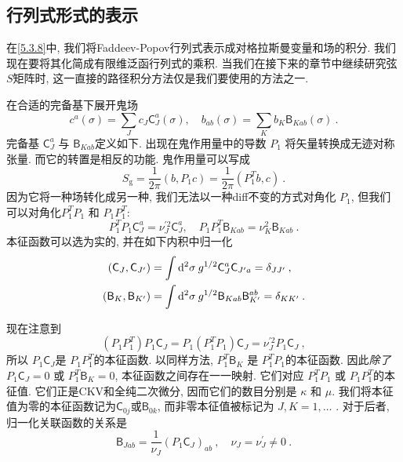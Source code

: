 \subsection*{行列式形式的表示}

在\eqref{5.3.8}中, 我们将Faddeev-Popov行列式表示成对格拉斯曼变量和场的积分. 我们现在要将其化简成有限维泛函行列式的乘积. 
当我们在接下来的章节中继续研究弦$S$矩阵时, 这一直接的路径积分方法仅是我们要使用的方法之一.

在合适的完备基下展开鬼场
\begin{equation}
	c^{a}(\sigma)=\sum_{J} c_{J} \mathsf{C}_{J}^{a}(\sigma), \quad b_{a b}(\sigma)=\sum_{K} b_{K} \mathsf{B}_{K a b}(\sigma) \:. \label{5.3.10}
\end{equation}
完备基 $\mathsf{C}_{J}^{a}$ 与 $\mathsf{B}_{K a b}$定义如下. 出现在鬼作用量中的导数 $P_{1}$ 将矢量转换成无迹对称张量. 而它的转置是相反的功能. 鬼作用量可以写成
\begin{equation}
	S_{\mathrm{g}}=\frac{1}{2 \pi}(b, P_{1} c)=\frac{1}{2 \pi}(P_{1}^{T} b, c) \:. \label{5.3.11}
\end{equation}
因为它将一种场转化成另一种, 我们无法以一种diff不变的方式对角化 $P_{1}$, 但我们可以对角化$P_{1}^{T} P_{1}$ 和 $P_{1} P_{1}^{T}$: 
\begin{equation}
	P_{1}^{T} P_{1} \mathsf{C}_{J}^{a}=\nu_{J}^{\prime 2} \mathsf{C}_{J}^{a}, \quad P_{1} P_{1}^{T} \mathsf{B}_{K a b}=\nu_{K}^{2} \mathsf{B}_{K a b} \:. \label{5.3.12}
\end{equation}
本征函数可以选为实的, 并在如下内积中归一化
\begin{subequations} \label{5.3.13}
\begin{align}
(\mathsf{C}_{J}, \mathsf{C}_{J^{\prime}}) &=\int \mathrm{d}^{2} \sigma \: g^{1/2} \mathsf{C}_{J}^{a} \mathsf{C}_{J^{\prime} a}=\delta_{J J^{\prime}} \:, \label{5.3.13a} \\
(\mathsf{B}_{K}, \mathsf{B}_{K^{\prime}}) &=\int \mathrm{d}^{2} \sigma \: g^{1 / 2} \mathsf{B}_{K a b} \mathsf{B}_{K^{\prime}}^{a b}
=\delta_{K K^{\prime}} \:. \label{5.3.13b}
\end{align}
\end{subequations}

现在注意到
\begin{equation}
	(P_{1} P_{1}^{T}) P_{1} \mathsf{C}_{J}=P_{1}(P_{1}^{T} P_{1}) \mathsf{C}_{J}=\nu_{J}^{\prime 2} P_{1} \mathsf{C}_{J} \:, \label{5.3.14}
\end{equation}
所以 $P_{1} \mathsf{C}_{J}$是 $P_{1} P_{1}^{T} $的本征函数. 以同样方法, $P_{1}^{T} \mathsf{B}_{K}$ 是 $P_{1}^{T} P_{1} $的本征函数. 
因此\emph{除了}$P_{1} \mathsf{C}_{J}=0$ 或 $P_{1}^{T} \mathsf{B}_{K}=0 $, 本征函数之间存在一一映射.  它们对应 $P_{1}^{T} P_{1}$ 或 $P_{1} P_{1}^{T} $的本征值. 它们正是CKV和全纯二次微分, 因而它们的数目分别是 $\kappa$ 和 $\mu$. 我们将本征值为零的本征函数记为$\mathsf{C}_{0 j}$或$\mathsf{B}_{0 k}$, 
而非零本征值被标记为 $J, K=1, \ldots$ . 对于后者, 归一化关联函数的关系是
\begin{equation}
	\mathsf{B}_{J a b}=\frac{1}{\nu_{J}}(P_{1} \mathsf{C}_{J})_{a b} \:, \quad \nu_{J}=\nu_{J}^{\prime} \neq 0 \:. \label{5.3.15}
\end{equation}

